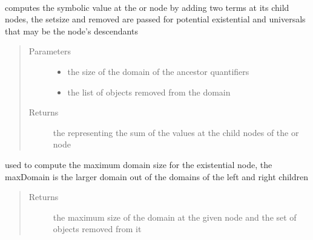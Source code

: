 \documentclass[letterpaper,10pt,english,openany,oneside]{sphinxmanual}
\begin{document}
\begin{fulllineitems}
\label{\detokenize{index:circuit.OrNode}}~

\begin{fulllineitems}
\label{\detokenize{index:circuit.OrNode.compute}}
computes the symbolic value at the or node by adding two terms at its child nodes, the setsize and removed are passed for potential 
existential and universals that may be the node’s descendants
\begin{quote}\begin{description}
\item[{Parameters}] \leavevmode\begin{itemize}
\item {} 
 \textendash{} the size of the domain of the ancestor quantifiers

\item {} 
 \textendash{} the list of objects removed from the domain

\end{itemize}

\item[{Returns}] \leavevmode
the {\hyperref[\detokenize{index:term.Term}]{}} representing the sum of the values at the child nodes of the or node

\end{description}\end{quote}

\end{fulllineitems}


\begin{fulllineitems}
\label{\detokenize{index:circuit.OrNode.maxDomainSize}}
used to compute the maximum domain size for the existential node, the maxDomain is the larger domain out of the domains of the
left and right children
\begin{quote}\begin{description}
\item[{Returns}] \leavevmode
the maximum size of the domain at the given node and the set of objects removed from it


\end{description}
\end{quote}
\end{fulllineitems}
\end{fulllineitems}
\end{document}
